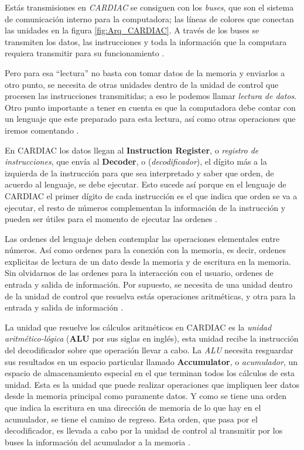 \documentclass[letterpaper,12pt,oneside]{book}
\begin{document}
		Estás transmisiones en \textit{CARDIAC} se consiguen con los \textit{buses}, que 
		son el sistema de comunicación interno para la computadora; las líneas de colores que conectan las unidades
		en la figura \ref{fig:Arq_CARDIAC}. A través de los buses se transmiten los datos, las instrucciones y toda
		la información que la computara requiera transmitir para su funcionamiento \cite{tanenbaum_structured_2013}.
		
		Pero para esa ``lectura'' no basta con tomar datos de la memoria y enviarlos a otro punto, se necesita de otras unidades dentro de la 
		unidad de control
		que procesen las instrucciones transmitidas; a eso le podemos
		llamar \textit{lectura de datos}. Otro punto importante a tener en cuenta es que la computadora
		debe contar con un lenguaje que este preparado para esta lectura, así como otras
		operaciones que iremos comentando \cite{von_neumann_papers_1987}.
		
		
		En CARDIAC los datos llegan
		al \textbf{Instruction Register}, o \textit{registro de instrucciones},
		que envía al \textbf{Decoder}, o (\textit{decodificador}), el dígito más a la izquierda de la instrucción para que
		sea interpretado y saber que orden, de acuerdo al lenguaje,
		se debe ejecutar. Esto sucede así porque en el lenguaje de CARDIAC el primer dígito de cada instrucción es el que indica que orden
		se va a ejecutar, el resto de números complementan la información de la instrucción y pueden
		ser útiles para el momento de ejecutar las ordenes \cite{fingerman_instruction_1968}.
		
		Las ordenes del lenguaje deben contemplar las operaciones elementales entre números. Así como
		ordenes para la conexión con la memoria, es decir, ordenes explicitas de lectura de un dato desde la memoria
		y de escritura en la memoria. Sin olvidarnos de 
		las ordenes para la interacción con el usuario, ordenes de entrada y salida de información. Por supuesto, se necesita de una
		unidad dentro de la unidad de control que resuelva estás operaciones aritméticas, y otra para la entrada y salida de información 
		\cite{von_neumann_papers_1987}.
		
		La 
		unidad
		que resuelve los cálculos aritméticos en CARDIAC es la \textit{unidad aritmético-lógica} (\textbf{ALU} por sus siglas en inglés), 
		esta unidad recibe la instrucción del decodificador sobre que operación llevar a cabo.
		La \textit{ALU} necesita resguardar sus 
		resultados en un espacio particular llamado \textbf{Accumulator}, o \textit{acumulador}, un espacio de almacenamiento especial en el que terminan 
		todos los 
		cálculos
		de esta unidad. Esta es la unidad que puede realizar operaciones que impliquen leer datos
		desde la memoria principal como puramente datos. Y como se tiene una orden que indica la escritura
		en una dirección de memoria de lo que hay en el acumulador, se tiene el camino de regreso.
		Esta orden, que pasa por el decodificador, es llevada a cabo por la unidad de control al
		transmitir por los buses la información del acumulador a la memoria \cite{fingerman_instruction_1968}.
		
\end{document}
